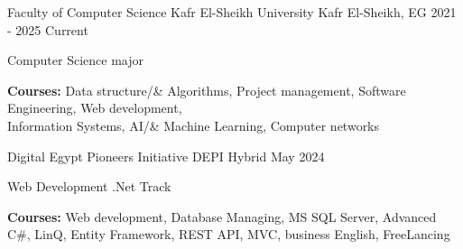 

\begin{cventries}

  \cventry
    {Faculty of Computer Science} %
    {Kafr El-Sheikh University} %
    {Kafr El-Sheikh, EG} %
    {2021 - 2025 Current} %
    {
      \begin{cvitems} %
        \item {Computer Science major}
        \item {\textbf{Courses:} Data structure/\& Algorithms, Project management, Software Engineering, Web development,\\ Information Systems, AI/\& Machine Learning, Computer networks}
      \end{cvitems}
    }  
     \cventry
    {Digital Egypt Pioneers Initiative} %
    {DEPI} %
    {Hybrid} %
    {May 2024} %
    {
      \begin{cvitems} %
        \item {Web Development .Net Track}
        \item {\textbf{Courses:} Web development, Database Managing, MS SQL Server, Advanced C#, LinQ, Entity Framework, REST API, MVC, business English, FreeLancing }
      \end{cvitems}
    }  
\end{cventries}
